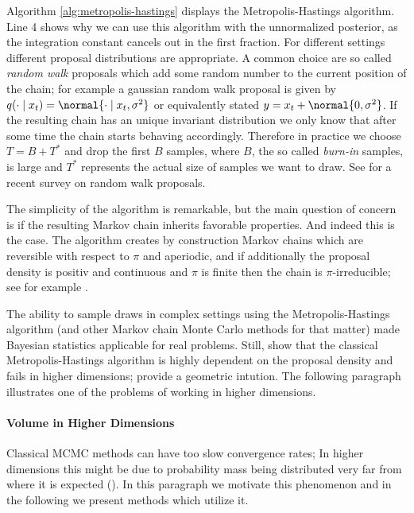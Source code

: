 \noindent
Algorithm \ref{alg:metropolis-hastings} displays the Metropolis-Hastings algorithm.
Line 4 shows why we can use this algorithm with the unnormalized posterior, as the integration constant cancels out in the first fraction.
For different settings different proposal distributions are appropriate.
A common choice are so called \emph{random walk} proposals which add some random number to the current position of the chain; for example a gaussian random walk proposal is given by $q(\cdot \mid x_t) = \normal{\cdot \mid x_t, \sigma^2}$ or equivalently stated $y = x_t + \normal{0, \sigma^2}$.
If the resulting chain has an unique invariant distribution we only know that after some time the chain starts behaving accordingly.
Therefore in practice we choose $T = B + T^*$ and drop the first $B$ samples, where $B$, the so called \emph{burn-in} samples, is large and $T^*$ represents the actual size of samples we want to draw.
See \citet{sherlock2010} for a recent survey on random walk proposals.

The simplicity of the algorithm is remarkable, but the main question of concern is if the resulting Markov chain inherits favorable properties.
And indeed this is the case.
The algorithm creates by construction Markov chains which are reversible with respect to $\pi$ and aperiodic, and if additionally the proposal density is positiv and continuous and $\pi$ is finite then the chain is $\pi$-irreducible; see for example \citet{roberts2004}.

The ability to sample draws in complex settings using the Metropolis-Hastings algorithm (and other Markov chain Monte Carlo methods for that matter) made Bayesian statistics applicable for real problems.
Still, \citet{Au2001EstimationOS} show that the classical Metropolis-Hastings algorithm is highly dependent on the proposal density and fails in higher dimensions; \citet{zuev08} provide a geometric intution.
The following paragraph illustrates one of the problems of working in higher dimensions.

\paragraph{Volume in Higher Dimensions}
Classical MCMC methods can have too slow convergence rates; In higher dimensions this might be due to probability mass being distributed very far from where it is expected (\citet{betancourt2017convergence}).
In this paragraph we motivate this phenomenon and in the following we present methods which utilize it.

